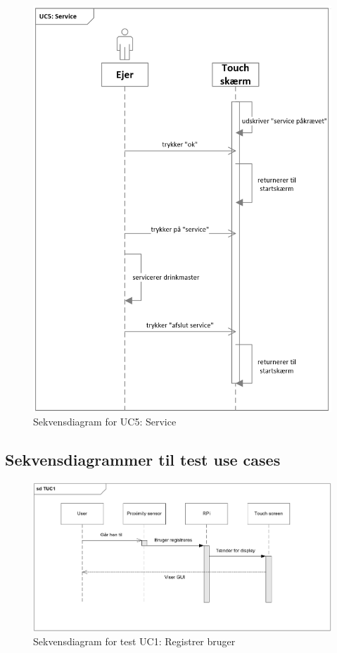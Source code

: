 \begin{figure}[H]
	\centering
	\includegraphics[width=1\textwidth]{Images/UC5service.png}
	\caption{Sekvensdiagram for UC5: Service}
	\label{fig:UC2}
\end{figure}

\subsection{Sekvensdiagrammer til test use cases}

\begin{figure}[H]
	\centering
	\includegraphics[width=1\textwidth]{Images/TUC1.png}
	\caption{Sekvensdiagram for test UC1: Registrer bruger}
	\label{fig:testUC1}
\end{figure}

